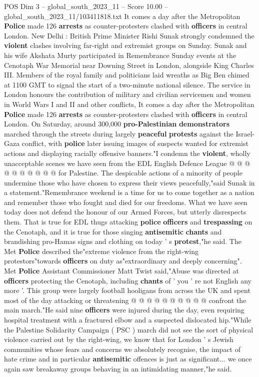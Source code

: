 \begin{textsample}{POS Dim 3 – global\_south\_2023\_11 – Score 10.00 – global\_south\_2023\_11/103411818.txt}  \label{ex:f3_pos_353}
It comes a day after the Metropolitan \textbf{Police} made 126 \textbf{arrests} as counter-protesters clashed with \textbf{officers} in central London.
New Delhi : British Prime Minister Rishi Sunak strongly condemned the \textbf{violent} clashes involving far-right and extremist groups on Sunday.
Sunak and his wife Akshata Murty participated in Remembrance Sunday events at the Cenotaph War Memorial near Downing Street in London, alongside King Charles III.
Members of the royal family and politicians laid wreaths as Big Ben chimed at 1100 GMT to signal the start of a two-minute national silence.
The service in London honours the contribution of military and civilian servicemen and women in World Wars I and II and other conflicts, It comes a day after the Metropolitan \textbf{Police} made 126 \textbf{arrests} as counter-protesters clashed with \textbf{officers} in central London.
On Saturday, around 300,000 \textbf{pro-Palestinian} \textbf{demonstrators} marched through the streets during largely \textbf{peaceful} \textbf{protests} against the Israel-Gaza conflict, with \textbf{police} later issuing images of suspects wanted for extremist actions and displaying racially offensive banners."I condemn the \textbf{violent}, wholly unacceptable scenes we have seen from the EDL English Defence League @ @ @ @ @ @ @ @ @ @ for Palestine.
The despicable actions of a minority of people undermine those who have chosen to express their views peacefully,"said Sunak in a statement."Remembrance weekend is a time for us to come together as a nation and remember those who fought and died for our freedoms.
What we have seen today does not defend the honour of our Armed Forces, but utterly disrespects them.
That is true for EDL thugs attacking \textbf{police} \textbf{officers} and \textbf{trespassing} on the Cenotaph, and it is true for those singing \textbf{antisemitic} \textbf{chants} and brandishing pro-Hamas signs and clothing on today ' s \textbf{protest},"he said.
The Met \textbf{Police} described the"extreme violence from the right-wing protestors"towards \textbf{officers} on duty as"extraordinary and deeply concerning".
Met \textbf{Police} Assistant Commissioner Matt Twist said,"Abuse was directed at \textbf{officers} protecting the Cenotaph, including \textbf{chants} of ' you ' re not English any more '.
This group were largely football hooligans from across the UK and spent most of the day attacking or threatening @ @ @ @ @ @ @ @ @ @ confront the main march."He said nine \textbf{officers} were injured during the day, even requiring hospital treatment with a fractured elbow and a suspected dislocated hip."While the Palestine Solidarity Campaign ( PSC ) march did not see the sort of physical violence carried out by the right-wing, we know that for London ' s Jewish communities whose fears and concerns we absolutely recognise, the impact of hate crime and in particular \textbf{antisemitic} offences is just as significant... we once again saw breakaway groups behaving in an intimidating manner,"he said.

\end{textsample}
